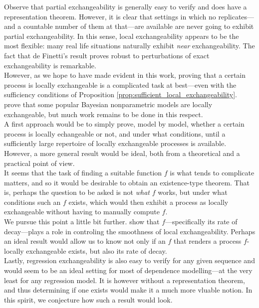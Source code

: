 Observe that partial exchangeability is generally easy to verify and does have a representation theorem. However, it is clear that settings in which no replicates---and a countable number of them at that---are available are never going to exhibit partial exchangeability. In this sense, local exchangeability appears to be the most flexible: many real life situations naturally exhibit \textit{near} exchangeability. The fact that de Finetti's result proves robust to perturbations of exact exchangeability is remarkable. 
\\


However, as we hope to have made evident in this work, proving that a certain process is locally exchangeable is a complicated task at best---even with the sufficiency conditions of Proposition \ref{prop:sufficient_local_exchangeability}. \cite{CampbellEtAl:2019:LocalExch} prove that some popular Bayesian nonparametric models are locally exchangeable, but much work remains to be done in this respect. 
\\

A first approach would be to simply prove, model by model, whether a certain process is locally echangeable or not, and under what conditions, until a sufficiently large repertoire of locally exchangeable processes is available. However, a more general result would be ideal, both from a theoretical and a practical point of view. 
\\

It seems that the task of finding a suitable function $f$ is what tends to complicate matters, and so it would be desirable to obtain an existence-type theorem. That is, perhaps the question to be asked is not \textit{what} $f$ works, but under what conditions such an $f$ exists, which would then exhibit a process as locally exchangeable without having to manually compute $f$. 
\\

We pursue this point a little bit further. \cite{CampbellEtAl:2019:LocalExch} show that $f$---specifically its rate of decay---plays a role in controling the smoothness of local exchangeability. Perhaps an ideal result would allow us to know not only if an $f$ that renders a process $f$-locally exchangeable exists, but also its rate of decay.
\\


Lastly, regression exchangeability is also easy to verify for any given sequence and would seem to be an ideal setting for most of dependence modelling---at the very least for any regression model. It is however without a representation theorem, and thus determining if one exists would make it a much more vluable notion. In this spirit, we conjecture how such a result would look.